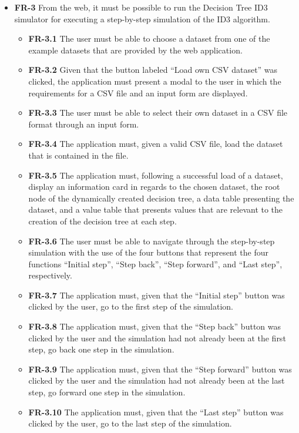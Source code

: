 \begin{itemize}
    \item \textbf{FR-3} From the web, it must be possible to run the Decision Tree ID3 simulator for executing a step-by-step simulation of the ID3 algorithm.
    \begin{itemize}
        \item \textbf{FR-3.1} The user must be able to choose a dataset from one of the example datasets that are provided by the web application.
        \item \textbf{FR-3.2} Given that the button labeled ``Load own CSV dataset'' was clicked, the application must present a modal to the user in which the requirements for a CSV file and an input form are displayed.
        \item \textbf{FR-3.3} The user must be able to select their own dataset in a CSV file format through an input form.
        \item \textbf{FR-3.4} The application must, given a valid CSV file, load the dataset that is contained in the file.
        \item \textbf{FR-3.5} The application must, following a successful load of a dataset, display an information card in regards to the chosen dataset, the root node of the dynamically created decision tree, a data table presenting the dataset, and a value table that presents values that are relevant to the creation of the decision tree at each step.
        \item \textbf{FR-3.6} The user must be able to navigate through the step-by-step simulation with the use of the four buttons that represent the four functions ``Initial step'', ``Step back'', ``Step forward'', and ``Last step'', respectively.
        \item \textbf{FR-3.7} The application must, given that the ``Initial step'' button was clicked by the user, go to the first step of the simulation.
        \item \textbf{FR-3.8} The application must, given that the ``Step back'' button was clicked by the user and the simulation had not already been at the first step, go back one step in the simulation.
        \item \textbf{FR-3.9} The application must, given that the ``Step forward'' button was clicked by the user and the simulation had not already been at the last step, go forward one step in the simulation.
        \item \textbf{FR-3.10} The application must, given that the ``Last step'' button was clicked by the user, go to the last step of the simulation.
    \end{itemize}
\end{itemize}

